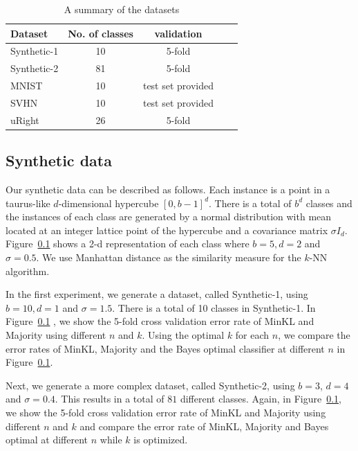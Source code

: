 \documentclass{article}
\begin{document}
\begin{table}[t]
\caption{A summary of the datasets}
\label{table:datasets}
\vskip 0.15in
\begin{center}
\begin{small}
\begin{sc}
\begin{tabular}{lcccr}
\hline
\abovespace\belowspace
Dataset & No. of classes & validation \\
\hline
\abovespace
Synthetic-1   & 10 & 5-fold \\
Synthetic-2 & 81 & 5-fold\\
\belowspace
MNIST & 10 & test set provided\\
SVHN & 10 & test set provided\\
uRight & 26 & 5-fold\\
\hline
\end{tabular}
\end{sc}
\end{small}
\end{center}
\vskip -0.1in
\end{table}

\subsection{Synthetic data}
Our synthetic data can be described as follows. Each instance is a
point in a taurus-like $d$-dimensional hypercube $[0,b-1]^d$. There is
a total of $b^d$ classes and the instances of each class are generated
by a normal distribution with mean located at an integer lattice point
of the hypercube and a covariance matrix $\sigma I_d$. Figure~\ref{}
shows a 2-d representation of each class where $b=5, d= 2$ and $\sigma
= 0.5$. We use Manhattan distance as the similarity measure for the
$k$-NN algorithm.

In the first experiment, we generate a dataset, called Synthetic-1,
using $b=10, d=1$ and $\sigma=1.5$. There is a total of 10 classes in
Synthetic-1. In Figure~\ref{} , we show the 5-fold cross validation
error rate of MinKL and Majority using different $n$ and $k$. Using
the optimal $k$ for each $n$, we compare the error rates of MinKL,
Majority and the Bayes optimal classifier at different $n$ in
Figure~\ref{}. 


Next, we generate a more complex dataset, called Synthetic-2, using
$b=3$, $d=4$ and $\sigma=0.4$. This results in a total of $81$ different
classes. Again, in Figure~\ref{}, we show the 5-fold cross validation
error rate of MinKL and Majority using different $n$ and $k$ and
compare the error rate of MinKL, Majority and Bayes optimal at
different $n$ while $k$ is optimized.
\end{document}
